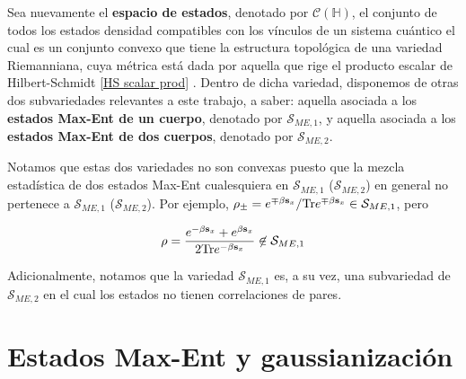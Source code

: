 \documentclass{report} %
\numberwithin{equation}{section}
\begin{document}
\begin{Omitir}
Sea nuevamente el \textbf{espacio de estados}, denotado por $\mathcal{C}(\mathds{H})$, el conjunto de todos los estados densidad compatibles con los vínculos de un sistema cuántico el cual es un conjunto convexo que tiene la estructura topológica de una variedad Riemanniana, cuya métrica está dada por aquella que rige el producto escalar de Hilbert-Schmidt \eqref{HS scalar prod} \cite{Nielsen.00, NakaharaM}. Dentro de dicha variedad, disponemos de otras dos subvariedades relevantes a este trabajo, a saber: aquella asociada a los \textbf{estados Max-Ent de un cuerpo}, denotado por $\mathcal{S}_{ME,1}$, y aquella asociada a los \textbf{estados Max-Ent de dos cuerpos}, denotado por $\mathcal{S}_{ME,2}$. 

Notamos que estas dos variedades no son convexas puesto que la  mezcla estadística de dos estados Max-Ent cualesquiera en $\mathcal{S}_{ME,1}$ ($\mathcal{S}_{ME,2}$) en general no pertenece a $\mathcal{S}_{ME,1}$ ($\mathcal{S}_{ME,2}$). Por ejemplo, $\rho_{\pm}=e^{\mp \beta{\bf s}_x}/{\Tr}e^{\mp \beta{\bf s}_x} \in \mathcal{S}_{ME,1}$,  pero

$$
\rho=\frac{e^{- \beta{\bf s}_x}+e^{\beta{\mathbf s}_x}}{2 \mathrm{Tr}e^{- \beta{\mathbf s}_x}} \not\in 
\mathcal{S}_{ME,1}
$$

Adicionalmente, notamos que la variedad $\mathcal{S}_{ME,1}$ es, a su vez, una subvariedad de $\mathcal{S}_{ME,2}$ en el cual los estados no tienen correlaciones de pares. \\
\end{Omitir}

\section{Estados Max-Ent y gaussianizaci\'on}
\end{document}
